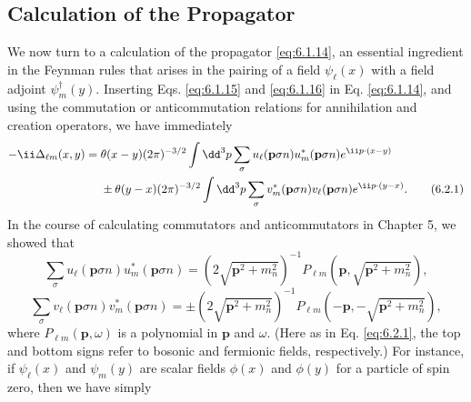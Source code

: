 
\subsection{Calculation of the Propagator}

We now turn to a calculation of the propagator \eqref{eq:6.1.14}, an essential
ingredient in the Feynman rules that arises in the pairing of a field
$\psi_\ell(x)$ with a field adjoint $\psi_m^\dagger(y)$. Inserting Eqs.
\eqref{eq:6.1.15} and \eqref{eq:6.1.16} in Eq. \eqref{eq:6.1.14}, and using the commutation or
anticommutation relations for annihilation and creation operators, we have
immediately
\begin{align}
-\ii\Delta_{\ell m}(x,y)={}&
 \theta(x-y)(2\pi)^{-3/2}\int \dd^3p\sum_\sigma
 u_\ell(\mathbf p\sigma n)u_m^*(\mathbf p\sigma n)e^{\ii p\cdot(x-y)}
\notag\\
&\mathbin{\pm}\theta(y-x)(2\pi)^{-3/2}\int \dd^3p\sum_\sigma
 v_m^*(\mathbf p\sigma n)v_\ell(\mathbf p\sigma n)e^{\ii p\cdot(y-x)}.
\tag{6.2.1}
\label{eq:6.2.1}
\end{align}
In the course of calculating commutators and anticommutators in Chapter 5, we
showed that
\begin{equation}
\sum_\sigma u_\ell(\mathbf p\sigma n)u_m^*(\mathbf p\sigma n)
=\left(2\sqrt{\mathbf p^2+m_n^2}\right)^{-1}
 P_{\ell m}\!\left(\mathbf p,\sqrt{\mathbf p^2+m_n^2}\right),
\tag{6.2.2}
\label{eq:6.2.2}
\end{equation}
\begin{equation}
\sum_\sigma v_\ell(\mathbf p\sigma n)v_m^*(\mathbf p\sigma n)
=\mathbin{\pm}\left(2\sqrt{\mathbf p^2+m_n^2}\right)^{-1}
 P_{\ell m}\!\left(-\mathbf p,-\sqrt{\mathbf p^2+m_n^2}\right),
\tag{6.2.3}
\label{eq:6.2.3}
\end{equation}
where $P_{\ell m}(\mathbf p,\omega)$ is a polynomial in $\mathbf p$ and
$\omega$. (Here as in Eq. \eqref{eq:6.2.1}, the top and bottom signs refer to bosonic
and fermionic fields, respectively.) For instance, if $\psi_\ell(x)$ and
$\psi_m(y)$ are scalar fields $\phi(x)$ and $\phi(y)$ for a particle of spin
zero, then we have simply
